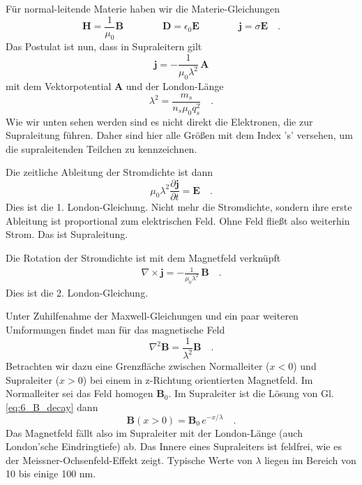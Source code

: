Für normal-leitende Materie haben wir die Materie-Gleichungen
\begin{equation}
    \bm{H} = \frac{1}{\mu_0} \bm{B} \qquad\qquad
    \bm{D} = \epsilon_0 \bm{E} \qquad\qquad
    \bm{j} = \sigma \bm{E} \quad .
\end{equation}
Das Postulat ist nun, dass in Supraleitern gilt
\begin{equation}
    \bm{j} = - \frac{1}{\mu_0 \lambda^2} \, \bm{A}
\end{equation}
mit dem Vektorpotential $\bm{A}$ und  der London-Länge 
\begin{equation}
    \lambda^2 = \frac{m_s}{n_s \mu_0 q_s^2} \quad .
\end{equation}
Wie wir unten sehen werden sind es nicht direkt die Elektronen, die zur Supraleitung führen. Daher sind hier alle Größen mit dem Index 's' versehen, um die supraleitenden Teilchen zu kennzeichnen. 

Die zeitliche Ableitung der Stromdichte ist dann
\begin{equation}
    \mu_0 \lambda^2  \frac{\partial  \bm{j}}{\partial t} = \bm{E} \quad .
\end{equation}
Dies ist die 1. London-Gleichung.
Nicht mehr die Stromdichte, sondern ihre erste Ableitung ist proportional zum elektrischen Feld. Ohne Feld fließt also weiterhin Strom. Das ist Supraleitung.

Die Rotation der Stromdichte ist mit dem Magnetfeld verknüpft
\begin{eqnarray}
    \nabla \times \bm{j} =  - \frac{1}{\mu_0 \lambda^2} \, \bm{B} \quad .
\end{eqnarray}
Dies ist die 2. London-Gleichung.


Unter Zuhilfenahme der Maxwell-Gleichungen und ein paar weiteren Umformungen findet man für das magnetische Feld
\begin{equation}
    \nabla^2 \bm{B} = \frac{1}{\lambda^2} \bm{B} \quad . \label{eq:6_B_decay}
\end{equation}
Betrachten wir dazu eine Grenzfläche zwischen Normalleiter ($x<0$) und Supraleiter ($x>0$) bei einem in z-Richtung orientierten Magnetfeld. Im Normalleiter sei das Feld homogen $\bm{B}_0$. Im Supraleiter ist die Lösung von Gl.\ref{eq:6_B_decay} dann
\begin{equation}
    \bm{B}(x>0) = \bm{B}_0 \, e^{- x / \lambda} \quad .
\end{equation}
Das Magnetfeld fällt also im Supraleiter mit der London-Länge (auch London'sche Eindringtiefe) ab. Das Innere eines Supraleiters ist feldfrei, wie es der Meissner-Ochsenfeld-Effekt zeigt. Typische Werte von $\lambda$ liegen im Bereich von 10 bis einige 100 nm.




